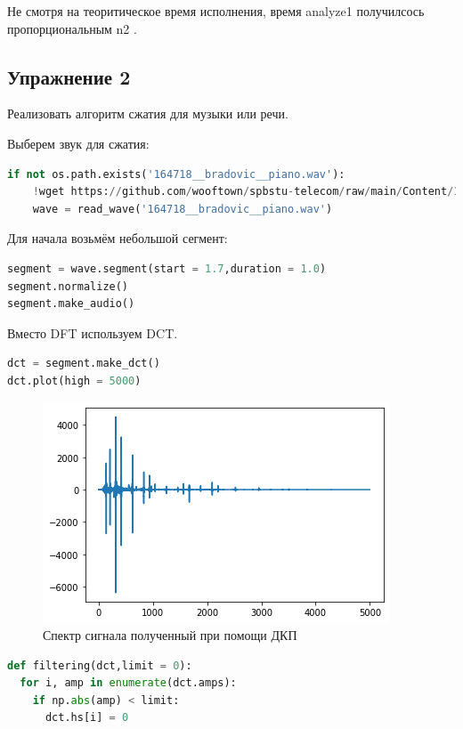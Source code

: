 Не смотря на теоритическое время исполнения, время analyze1 получилсось пропорциональным  n2 .

\subsection{Упражнение 2}

Реализовать алгоритм сжатия для музыки или речи.

Выберем звук для сжатия:
\begin{lstlisting}[language=Python]
if not os.path.exists('164718__bradovic__piano.wav'):
    !wget https://github.com/wooftown/spbstu-telecom/raw/main/Content/164718__bradovic__piano.wav
    wave = read_wave('164718__bradovic__piano.wav')
\end{lstlisting}

Для начала возьмём небольшой сегмент:

\begin{lstlisting}[language=Python]
segment = wave.segment(start = 1.7,duration = 1.0)
segment.normalize()
segment.make_audio()
\end{lstlisting}

Вместо DFT используем DCT.

\begin{lstlisting}[language=Python]
dct = segment.make_dct()
dct.plot(high = 5000)
\end{lstlisting}
\begin{figure}[H]
	\begin{center}
		\includegraphics[scale=1]{fig/lab06/lab06_29_0.png}
		\caption{Спектр сигнала полученный при помощи ДКП}
	\end{center}
\end{figure}

\begin{lstlisting}[language=Python]
def filtering(dct,limit = 0):
  for i, amp in enumerate(dct.amps):
    if np.abs(amp) < limit:
      dct.hs[i] = 0
\end{lstlisting}

